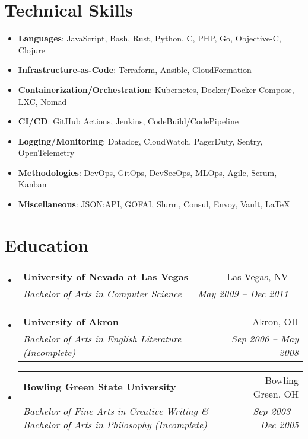 \documentclass[letterpaper,11pt]{article}
\makeatletter
\newcommand{\resumeSubheading}[4]{
  \vspace{-2pt}\item
    \begin{tabular*}{0.97\textwidth}[t]{l@{\extracolsep{\fill}}r}
      \textbf{#1} & #2 \\
      \textit{\small#3} & \textit{\small #4} \\
    \end{tabular*}\vspace{-7pt}
}
\newcommand{\resumeSubHeadingListStart}{\begin{itemize}[leftmargin=0.15in, label={}]}
\newcommand{\resumeSubHeadingListEnd}{\end{itemize}}
\newenvironment{resumeListicle}{
    \small        %
    \setlength{\itemsep}{0pt}
    \setlength{\parskip}{0pt}
}{}
\newcommand{\resumeListicleStart}{\begin{resumeListicle}}
\newcommand{\resumeListicleEnd}{\end{resumeListicle}}
\newcommand{\resumeListicleItem}[2]{%
  \item \textbf{#1}: #2%
}
\makeatother
\begin{document}
\section{Technical Skills}
  \resumeSubHeadingListStart
    \resumeListicleStart
      \resumeListicleItem{Languages}{JavaScript, Bash, Rust, Python, C, PHP, Go, Objective-C, Clojure } \\
      \resumeListicleItem{Infrastructure-as-Code}{Terraform, Ansible, CloudFormation } \\
      \resumeListicleItem{Containerization/Orchestration}{Kubernetes, Docker/Docker-Compose, LXC, Nomad } \\
      \resumeListicleItem{CI/CD}{GitHub Actions, Jenkins, CodeBuild/CodePipeline } \\
      \resumeListicleItem{Logging/Monitoring}{Datadog, CloudWatch, PagerDuty, Sentry, OpenTelemetry } \\
      \resumeListicleItem{Methodologies}{DevOps, GitOps, DevSecOps, MLOps, Agile, Scrum, Kanban } \\
      \resumeListicleItem{Miscellaneous}{JSON:API, GOFAI, Slurm, Consul, Envoy, Vault, \LaTeX{} } \\
    \resumeListicleEnd
  \resumeSubHeadingListEnd

\section{Education}
  \resumeSubHeadingListStart
    \resumeSubheading
      {University of Nevada at Las Vegas}{Las Vegas, NV}
      {Bachelor of Arts in Computer Science}{May 2009 – Dec 2011}
    \resumeSubheading
      {University of Akron}{Akron, OH}
      {Bachelor of Arts in English Literature (Incomplete)}{Sep 2006 – May 2008}
    \resumeSubheading
      {Bowling Green State University}{Bowling Green, OH}
      {Bachelor of Fine Arts in Creative Writing \& Bachelor of Arts in Philosophy (Incomplete)}{Sep 2003 – Dec 2005}
  \resumeSubHeadingListEnd

\end{document}
